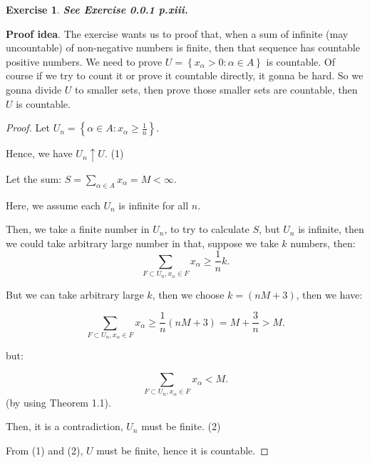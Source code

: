 \documentclass[11pt,a4paper]{article}
\theoremstyle{definition}
\newtheorem{exercise}[definition]{Exercise}
\theoremstyle{plain}
\newcommand{\set}[1]{\left\{#1\right\}}
\begin{document}
\begin{exercise}
\textbf{\textit{See Exercise 0.0.1 p.xiii.}}

\textbf{Proof idea}. The exercise wants us to proof that, when a sum of infinite (may uncountable) of non-negative numbers is finite, then that sequence has countable positive numbers.  We need to prove $U = \set{x_{\alpha} > 0: \alpha \in A}$ is countable. Of course if we try to count it or prove it countable directly, it gonna be hard. So we gonna divide $U$ to smaller sets, then prove those smaller sets are countable, then $U$ is countable.

\begin{proof}
Let $U_n = \set{\alpha\in A: x_{\alpha}\ge \frac{1}{n}}$.

Hence, we have $U_n \uparrow U$. (1)

Let the sum: $S = \sum_{\alpha \in A}x_\alpha = M < \infty$.

Here, we assume each $U_n$ is infinite for all $n$.

Then, we take a finite number in $U_n$, to try to calculate $S$, but $U_n$ is infinite, then we could take arbitrary large number in that, suppose we take $k$ numbers, then:
\[
\sum_{F\subset U_n, x_\alpha \in F}x_\alpha \ge \frac{1}{n}k.
\]

But we can take arbitrary large $k$, then we choose $k = (nM + 3)$, then we have:

\[
\sum_{F\subset U_n, x_\alpha \in F}x_\alpha \ge \frac{1}{n}(nM+3) = M + \frac{3}{n}>M.
\]

but:

\[
\sum_{F\subset U_n, x_\alpha \in F}x_\alpha < M.
\]
(by using Theorem 1.1).

Then, it is a contradiction, $U_n$ must be finite. (2)

From (1) and (2), $U$ must be finite, hence it is countable.
\end{proof}
\end{exercise}
\end{document}
